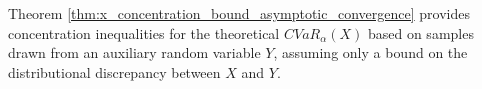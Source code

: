\documentclass[letterpaper]{article} %
\newtheorem{theorem}{Theorem}[section]
\begin{document}
Theorem \ref{thm:x_concentration_bound_asymptotic_convergence} provides concentration inequalities for the theoretical $CVaR_\alpha(X)$ based on samples drawn from an auxiliary random variable $Y$, assuming only a bound on the distributional discrepancy between $X$ and $Y$.
%		
%		
%		
\end{document}

